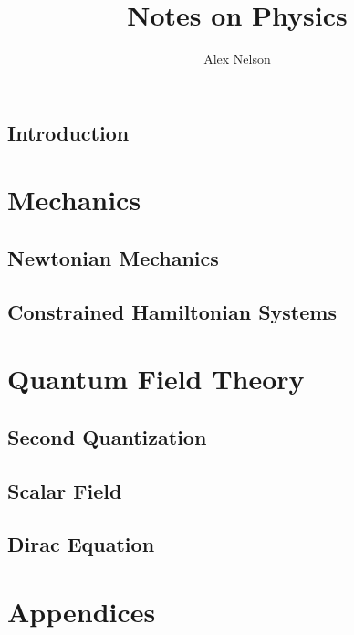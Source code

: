 \documentclass[oneside]{book}
\begin{document}
\frontmatter%

\hypersetup{pageanchor=false}
\title{Notes on Physics}
\author{Alex Nelson}
\maketitle

\preface %
\hypersetup{pageanchor=true}


\tableofcontents

\mainmatter%
\chapter{Introduction}


\part{Mechanics}
\chapter{Newtonian Mechanics}



\chapter{Constrained Hamiltonian Systems}


\part{Quantum Field Theory}
\chapter{Second Quantization}

\chapter{Scalar Field}

\chapter{Dirac Equation}


\backmatter%
\part{Appendices}
\appendix
\printbibliography[heading=bibintoc]
\clearpage
{}
\printindex
\end{document}
